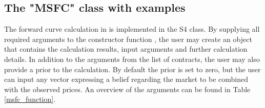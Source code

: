 \subsection{The "MSFC" class with examples}
The forward curve calculation in  is implemented in the S4  class. By supplying all required arguments to the constructor function , the user may create an object that contains the calculation results, input arguments and further calculation details. In addition to the arguments from the list of contracts, the user may also provide a prior to the calculation. By default the prior is set to zero, but the user can input any vector expressing a belief regarding the market to be combined with the observed prices. An overview of the  arguments can be found in Table \ref{msfc_function}.  

\begin{table}[h!]
\centering
{}
\caption{Arguments for the  constructor function for forward curve calculation.}
\label{msfc_function}
\end{table}

